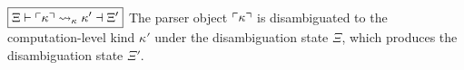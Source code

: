 \noindent $ \boxed{\Xi \vdash \ulcorner\kappa\urcorner \rightsquigarrow_\kappa \kappa' \dashv \Xi'} $ \quad The parser object $ \ulcorner\kappa\urcorner $ is disambiguated to the computation-level kind $ \kappa' $ under the disambiguation state $ \Xi $, which produces the disambiguation state $ \Xi' $.